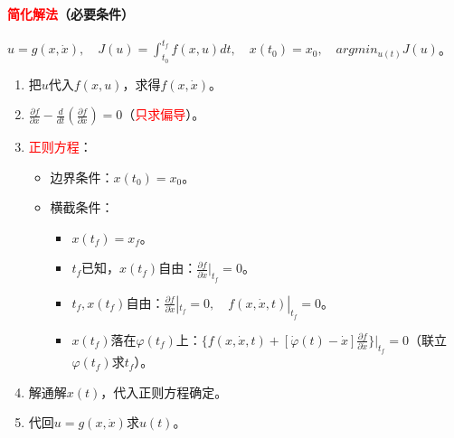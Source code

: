 \documentclass[
12pt, %
a4paper, 
oneside, %
]{scrartcl}
\begin{document}
\paragraph{\textcolor{red}{简化解法}（必要条件）}
$ u = g(x, \dot{x}), \quad J(u) = \int_{t_0}^{t_f} f(x, u) d t, \quad x(t_0) = x_0, \quad argmin_{u(t)} J(u) $。
\begin{enumerate}
\item 把$ u $代入$ f(x, u) $，求得$ f(x, \dot{x}) $。
\item $ \frac{\partial f}{\partial x} - \frac{d}{d t}(\frac{\partial f}{\partial \dot{x}}) = 0 $（\textcolor{red}{只求偏导}）。
\item \textcolor{red}{正则方程}：
\begin{itemize}
\item 边界条件：$ x(t_0) = x_0 $。
\item 横截条件：
\begin{itemize}
\item $ x(t_f) = x_f $。
\item $ t_f $已知，$ x(t_f) $自由：$ \frac{\partial f}{\partial \dot{x}}|_{t_f} = 0 $。
\item $ t_f, x(t_f) $自由：$ \frac{\partial f}{\partial \dot{x}}|_{t_f} = 0, \quad f(x, \dot{x}, t)|_{t_f} = 0 $。
\item $ x(t_f) $落在$ \varphi(t_f) $上：$ \{f(x, \dot{x}, t) + [\dot{\varphi}(t) - \dot{x}]\frac{\partial f}{\partial \dot{x}}\}|_{t_f} = 0 $（联立$ \varphi(t_f) $求$ t_f $）。
\end{itemize}
\end{itemize}
\item 解通解$ x(t) $，代入正则方程确定。
\item 代回$ u = g(x, \dot{x}) $求$ u(t) $。
\end{enumerate}
\end{document}

